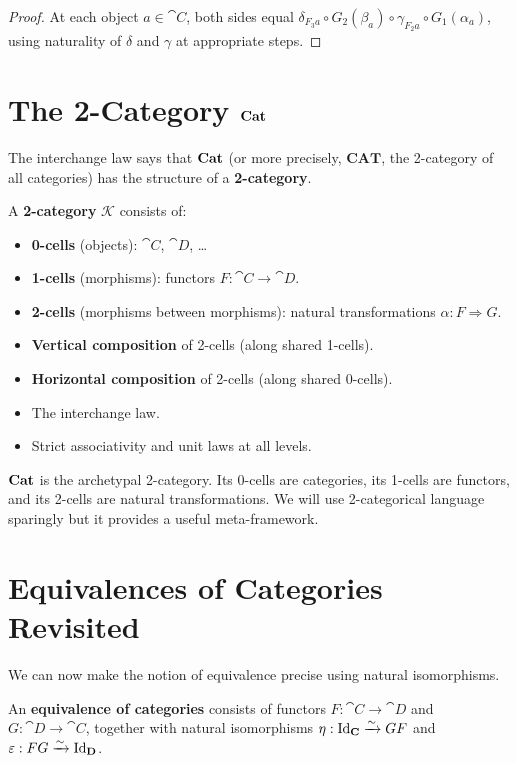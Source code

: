 \begin{proof}
At each object $a \in \cat{C}$, both sides equal $\delta_{F_3 a} \circ G_2(\beta_a) \circ \gamma_{F_2 a} \circ G_1(\alpha_a)$, using naturality of $\delta$ and $\gamma$ at appropriate steps.
\end{proof}

\section{The 2-Category \texorpdfstring{$\mathbf{Cat}$}{Cat}}

The interchange law says that $\mathbf{Cat}$ (or more precisely, $\mathbf{CAT}$, the 2-category of all categories) has the structure of a \textbf{2-category}.

\begin{definition}[2-Category]
A \textbf{2-category} $\mathcal{K}$ consists of:
\begin{itemize}
  \item \textbf{0-cells} (objects): $\cat{C}$, $\cat{D}$, \ldots
  \item \textbf{1-cells} (morphisms): functors $F: \cat{C} \to \cat{D}$.
  \item \textbf{2-cells} (morphisms between morphisms): natural transformations $\alpha: F \Rightarrow G$.
  \item \textbf{Vertical composition} of 2-cells (along shared 1-cells).
  \item \textbf{Horizontal composition} of 2-cells (along shared 0-cells).
  \item The interchange law.
  \item Strict associativity and unit laws at all levels.
\end{itemize}
\end{definition}

$\mathbf{Cat}$ is the archetypal 2-category. Its 0-cells are categories, its 1-cells are functors, and its 2-cells are natural transformations. We will use 2-categorical language sparingly but it provides a useful meta-framework.

\section{Equivalences of Categories Revisited}

We can now make the notion of equivalence precise using natural isomorphisms.

\begin{definition}
An \textbf{equivalence of categories} consists of functors $F: \cat{C} \to \cat{D}$ and $G: \cat{D} \to \cat{C}$, together with natural isomorphisms $\eta: \mathrm{Id}_{\mathbf{C}} \xrightarrow{\sim} GF$ and $\varepsilon: FG \xrightarrow{\sim} \mathrm{Id}_{\mathbf{D}}$.
\end{definition}

